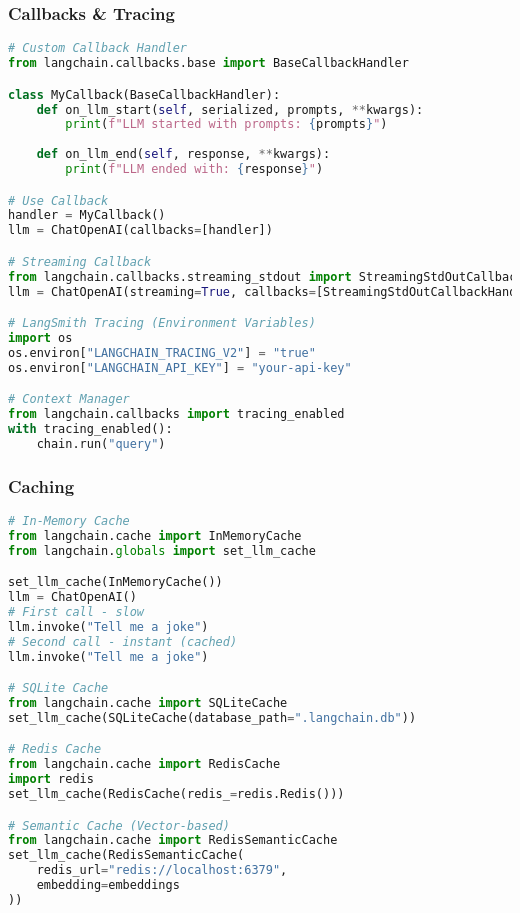 \begin{frame}[fragile]\frametitle{Callbacks \& Tracing}
\begin{lstlisting}[language=python,basicstyle=\tiny]
# Custom Callback Handler
from langchain.callbacks.base import BaseCallbackHandler

class MyCallback(BaseCallbackHandler):
    def on_llm_start(self, serialized, prompts, **kwargs):
        print(f"LLM started with prompts: {prompts}")
    
    def on_llm_end(self, response, **kwargs):
        print(f"LLM ended with: {response}")

# Use Callback
handler = MyCallback()
llm = ChatOpenAI(callbacks=[handler])

# Streaming Callback
from langchain.callbacks.streaming_stdout import StreamingStdOutCallbackHandler
llm = ChatOpenAI(streaming=True, callbacks=[StreamingStdOutCallbackHandler()])

# LangSmith Tracing (Environment Variables)
import os
os.environ["LANGCHAIN_TRACING_V2"] = "true"
os.environ["LANGCHAIN_API_KEY"] = "your-api-key"

# Context Manager
from langchain.callbacks import tracing_enabled
with tracing_enabled():
    chain.run("query")
\end{lstlisting}
\end{frame}

\begin{frame}[fragile]\frametitle{Caching}
\begin{lstlisting}[language=python,basicstyle=\tiny]
# In-Memory Cache
from langchain.cache import InMemoryCache
from langchain.globals import set_llm_cache

set_llm_cache(InMemoryCache())
llm = ChatOpenAI()
# First call - slow
llm.invoke("Tell me a joke")
# Second call - instant (cached)
llm.invoke("Tell me a joke")

# SQLite Cache
from langchain.cache import SQLiteCache
set_llm_cache(SQLiteCache(database_path=".langchain.db"))

# Redis Cache
from langchain.cache import RedisCache
import redis
set_llm_cache(RedisCache(redis_=redis.Redis()))

# Semantic Cache (Vector-based)
from langchain.cache import RedisSemanticCache
set_llm_cache(RedisSemanticCache(
    redis_url="redis://localhost:6379",
    embedding=embeddings
))
\end{lstlisting}
\end{frame}

